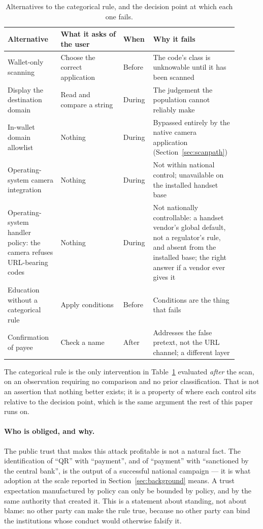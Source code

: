 \documentclass[10pt,a4paper,twocolumn]{article}
\newenvironment{widetable}{\begin{table}[t]}{\end{table}}
\newenvironment{widetable}{\begin{table}[t]}{\end{table}}
\begin{document}
\begin{widetable}
\centering
\small
\begin{tabular}{@{}p{0.22\linewidth}p{0.26\linewidth}p{0.10\linewidth}p{0.32\linewidth}@{}}
\toprule
\textbf{Alternative} & \textbf{What it asks of the user} & \textbf{When} & \textbf{Why it fails} \\
\midrule
Wallet-only scanning &
  Choose the correct application &
  Before &
  The code's class is unknowable until it has been scanned \\[0.3em]
Display the destination domain &
  Read and compare a string &
  During &
  The judgement the population cannot reliably make \citep{schechter2007emperor} \\[0.3em]
In-wallet domain allowlist &
  Nothing &
  During &
  Bypassed entirely by the native camera application (Section~\ref{sec:scanpath}) \\[0.3em]
Operating-system camera integration &
  Nothing &
  During &
  Not within national control; unavailable on the installed handset base \\[0.3em]
Operating-system handler policy: the camera refuses URL-bearing codes &
  Nothing &
  During &
  Not nationally controllable: a handset vendor's global default, not a
  regulator's rule, and absent from the installed base; the right answer if a
  vendor ever gives it \\[0.3em]
Education without a categorical rule &
  Apply conditions &
  Before &
  Conditions are the thing that fails \\[0.3em]
Confirmation of payee &
  Check a name &
  After &
  Addresses the false pretext, not the URL channel; a different layer \\
\bottomrule
\end{tabular}
\caption{Alternatives to the categorical rule, and the decision point at which
each one fails.}
\label{tab:alternatives}
\end{widetable}

The categorical rule is the only intervention in
Table~\ref{tab:alternatives} evaluated \emph{after} the scan, on an observation
requiring no comparison and no prior classification. That is not an assertion
that nothing better exists; it is a property of where each control sits relative
to the decision point, which is the same argument the rest of this paper runs on.

\paragraph{Who is obliged, and why.}
The public trust that makes this attack profitable is not a natural fact. The
identification of ``QR'' with ``payment'', and of ``payment'' with
``sanctioned by the central bank'', is the output of a successful national
campaign --- it is what adoption at the scale reported in Section~\ref{sec:background}
means. A trust expectation manufactured by policy can only be bounded by policy,
and by the same authority that created it. This is a statement about standing,
not about blame: no other party can make the rule true, because no other party
can bind the institutions whose conduct would otherwise falsify it.
\end{document}
